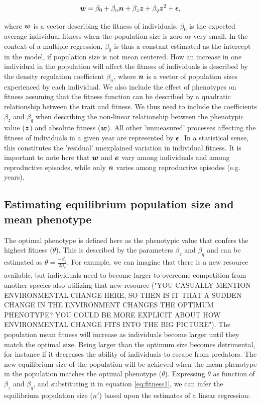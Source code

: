 \documentclass{article}
\begin{document}
\begin{equation} \label{eq:fitness1}
\vectorsym{w}=\beta_{0} +\beta_{n} \vectorsym{n} + \beta_{z} \vectorsym{z} + \beta_{q} \vectorsym{z}^2 + \vectorsym{\epsilon},
\end{equation}

\noindent where $\vectorsym{w}$ is a vector describing the fitness of individuals. $\beta_{0}$ is the expected average individual fitness when the population size is zero or very small. In the context of a multiple regression, $\beta_{0}$ is thus a constant estimated as the intercept in the model, if population size is not mean centered. How an increase in one individual in the population will affect the fitness of individuals is described by the density regulation coefficient $\beta_{n}$, where $\vectorsym{n}$ is a vector of population sizes experienced by each individual. We also include the effect of phenotypes on fitness assuming that the fitness function can be described by a quadratic relationship between the trait and fitness. We thus need to include the coefficients $\beta_{z}$ and $\beta_{q}$ when describing the non-linear relationship between the phenotypic value ($\vectorsym{z}$) and absolute fitness ($\vectorsym{w}$). All other 'unmeasured' processes affecting the fitness of individuals in a given year are represented by $ \vectorsym{\epsilon}$. In a statistical sense, this constitutes the 'residual' unexplained variation in individual fitness. It is important to note here that $\vectorsym{w}$ and $\vectorsym{e}$ vary among individuals and among reproductive episodes, while only $\vectorsym{n}$ varies among reproductive episodes (e.g. years).

\subsection{Estimating equilibrium population  size and mean phenotype}

 The optimal phenotype is defined here as the phenotypic value that confers the highest fitness ($\theta$). This is described by the parameters $\beta_{z}$ and $\beta_{q}$ and can be estimated as $\theta=\frac{-\beta_{z}}{2\beta_{q}}$. For example, we can imagine that there is a new resource available, but individuals need to become larger to overcome competition from another species also utilizing that new resource ("YOU CASUALLY MENTION ENVIRONMENTAL CHANGE HERE, SO THEN IS IT THAT A SUDDEN CHANGE IN THE ENVIRONMENT CHANGES THE OPTIMUM PHENOTYPE? YOU COULD BE MORE EXPLICIT ABOUT HOW ENVIRONMENTAL CHANGE FITS INTO THE BIG PICTURE"). The population mean fitness will increase as individuals become larger until they match the optimal size. Being larger than the optimum size becomes detrimental, for instance if it decreases the ability of individuals to escape from predators. The new equilibrium size of the population will be achieved when the mean phenotype in the population matches the optimal phenotype ($\theta$). Expressing $\theta$ as function of $\beta_{z}$ and $\beta_{q}$, and substituting it in equation \ref{eq:fitness1}, we can infer the equilibrium population size ($n'$) based upon the estimates of a linear regression:
\end{document}
